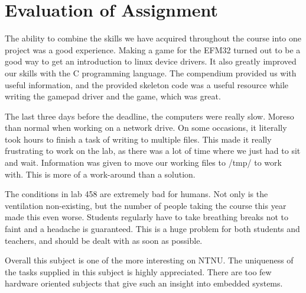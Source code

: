 \section{Evaluation of Assignment}

The ability to combine the skills we have acquired throughout the course into one project was a good experience.
Making a game for the EFM32 turned out to be a good way to get an introduction to linux device drivers.
It also greatly improved our skills with the C programming language.
The compendium \cite{eeds-compendium} provided us with useful information, and the provided skeleton code was a useful resource while writing the gamepad driver and the game, which was great.

The last three days before the deadline, the computers were really slow.
Moreso than normal when working on a network drive.
On some occasions, it literally took hours to finish a task of writing to multiple files.
This made it really frustrating to work on the lab, as there was a lot of time where we just had to sit and wait.
Information was given to move our working files to /tmp/ to work with.
This is more of a work-around than a solution.

The conditions in lab 458 are extremely bad for humans.
Not only is the ventilation non-existing, but the number of people taking the course this year made this even worse.
Students regularly have to take breathing breaks not to faint and a headache is guaranteed.
This is a huge problem for both students and teachers, and should be dealt with as soon as possible.

Overall this subject is one of the more interesting on NTNU.
The uniqueness of the tasks supplied in this subject is highly appreciated.
There are too few hardware oriented subjects that give such an insight into embedded systems.
